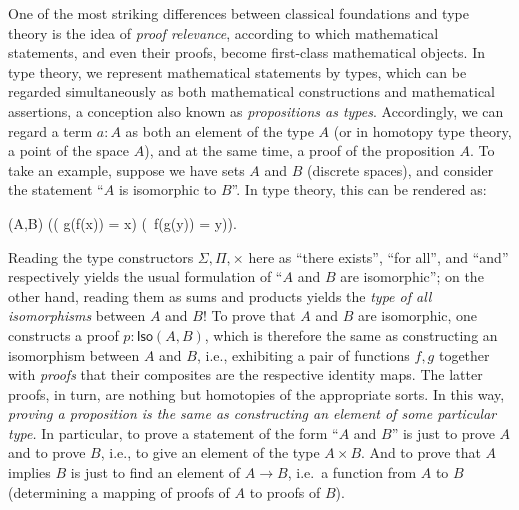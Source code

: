 One of the most striking differences between
classical foundations and type theory is
the idea of \emph{proof relevance}, according to which mathematical
statements, and even their proofs, become first-class mathematical
objects.  In type theory, we represent mathematical statements by
types, which can be regarded simultaneously as both mathematical
constructions and mathematical assertions, a conception also known as
\emph{propositions as types}.  %
Accordingly, we can regard a term $a : A$ as both an element of the
type $A$ (or in homotopy type theory, a point of the space $A$), and
at the same time, a proof of the proposition $A$.
To take an example, suppose we have sets $A$ and $B$ (discrete
spaces), and consider the statement ``$A$ is
isomorphic to $B$''.  In type theory, this can be rendered as:
\begin{narrowmultline*}
  (A,B)  \narrowbreak
  \Big(\big( g(f(x)) = x\big) \times \big(\, f(g(y)) = y\big)\Big).
\end{narrowmultline*}
%
Reading the type constructors $\Sigma, \Pi, \times$  here  as ``there exists'', ``for all'', and ``and'' respectively yields the usual formulation of ``$A$ and $B$ are isomorphic''; on the other hand, reading them as sums and products yields the \emph{type of all isomorphisms} between $A$ and $B$!  To prove that $A$ and $B$ are isomorphic, one  constructs a proof $p : \mathsf{Iso}(A,B)$, which is therefore the same  as constructing an isomorphism between $A$ and $B$, i.e., exhibiting a pair of functions $f, g$ together with \emph{proofs} that their composites are the respective identity maps.  The latter proofs, in turn, are nothing but homotopies of the appropriate sorts.  In this way, \emph{proving a proposition is the same as constructing an element of some particular type.}
In particular, to prove a statement of the form ``$A$ and $B$'' is just to prove $A$ and to prove $B$, i.e., to give an element of the type $A\times B$.
And to prove that $A$ implies $B$ is just to find an element of $A\to B$, i.e.\ a function from $A$ to $B$ (determining a mapping of proofs of $A$ to proofs of $B$).

